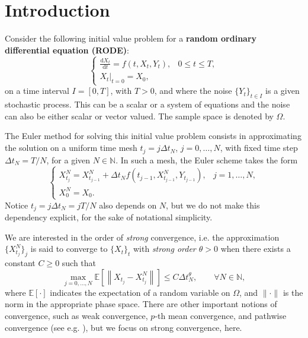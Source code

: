 \documentclass[reqno,12pt]{amsart}
\theoremstyle{plain} %
\theoremstyle{definition} %
\begin{document}
\maketitle

\section{Introduction}

Consider the following initial value problem for a \textbf{random ordinary differential equation (RODE)}:
\begin{equation}
  \label{rodeeq}
  \begin{cases}
    \displaystyle \frac{\mathrm{d}X_t}{\mathrm{d} t} = f(t, X_t, Y_t), & 0 \leq t \leq T, \\
    \left. X_t \right|_{t = 0} = X_0,
  \end{cases}
\end{equation}
on a time interval $I=[0, T]$, with $T > 0$, and where the noise $\{Y_t\}_{t\in I}$ is a given stochastic process. This can be a scalar or a system of equations and the noise can also be either scalar or vector valued. The sample space is denoted by $\Omega$.

The Euler method for solving this initial value problem consists in approximating the solution on a uniform time mesh $t_j = j\Delta t_N$, $j = 0, \ldots, N$, with fixed time step $\Delta t_N = T/N$, for a given $N\in \mathbb{N}$. In such a mesh, the Euler scheme takes the form
\begin{equation}
  \label{emscheme}
  \begin{cases}
    X_{t_j}^N = X_{t_{j-1}}^N + \Delta t_N f(t_{j-1}, X_{t_{j-1}}^N, Y_{t_{j-1}}), & j = 1, \ldots, N, \\
    X_0^N = X_0.
  \end{cases}
\end{equation}
Notice $t_j = j\Delta t_N = jT/N$ also depends on $N$, but we do not make this dependency explicit, for the sake of notational simplicity.

We are interested in the order of \emph{strong} convergence, i.e. the approximation $\{X_{t_j}^N\}_j$ is said to converge to $\{X_t\}_t$ with \emph{strong order $\theta>0$} when there exists a constant $C \geq 0$ such that
\begin{equation}
    \label{strongordertheta}
    \max_{j=0, \ldots, N}\mathbb{E}\left[ \left\| X_{t_j} - X_{t_j}^N \right\| \right] \leq C \Delta t_N^\theta, \qquad \forall N \in \mathbb{N},
\end{equation}
where $\mathbb{E}[\cdot]$ indicates the expectation of a random variable on $\Omega$, and $\|\cdot\|$ is the norm in the appropriate phase space. There are other important notions of convergence, such as weak convergence, $p$-th mean convergence, and pathwise convergence (see e.g. \cite{HanKloeden2017,HighamKloeden2021, JentzenKloeden2011}), but we focus on strong convergence, here.
\end{document}
